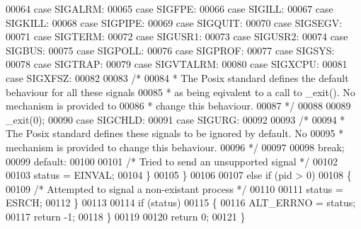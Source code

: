 \begin{DoxyCode}
00064     \textcolor{keywordflow}{case} SIGALRM:
00065     \textcolor{keywordflow}{case} SIGFPE:
00066     \textcolor{keywordflow}{case} SIGILL:
00067     \textcolor{keywordflow}{case} SIGKILL:
00068     \textcolor{keywordflow}{case} SIGPIPE:
00069     \textcolor{keywordflow}{case} SIGQUIT:
00070     \textcolor{keywordflow}{case} SIGSEGV:
00071     \textcolor{keywordflow}{case} SIGTERM:
00072     \textcolor{keywordflow}{case} SIGUSR1:
00073     \textcolor{keywordflow}{case} SIGUSR2:
00074     \textcolor{keywordflow}{case} SIGBUS:
00075     \textcolor{keywordflow}{case} SIGPOLL:
00076     \textcolor{keywordflow}{case} SIGPROF:
00077     \textcolor{keywordflow}{case} SIGSYS:
00078     \textcolor{keywordflow}{case} SIGTRAP:
00079     \textcolor{keywordflow}{case} SIGVTALRM:
00080     \textcolor{keywordflow}{case} SIGXCPU:
00081     \textcolor{keywordflow}{case} SIGXFSZ:
00082 
00083       \textcolor{comment}{/* }
00084 \textcolor{comment}{       * The Posix standard defines the default behaviour for all these signals }
00085 \textcolor{comment}{       * as being eqivalent to a call to \_exit(). No mechanism is provided to }
00086 \textcolor{comment}{       * change this behaviour.}
00087 \textcolor{comment}{       */}
00088 
00089       \_exit(0);
00090     \textcolor{keywordflow}{case} SIGCHLD:
00091     \textcolor{keywordflow}{case} SIGURG:
00092 
00093       \textcolor{comment}{/* }
00094 \textcolor{comment}{       * The Posix standard defines these signals to be ignored by default. No }
00095 \textcolor{comment}{       * mechanism is provided to change this behaviour.}
00096 \textcolor{comment}{       */}
00097 
00098       \textcolor{keywordflow}{break};
00099     \textcolor{keywordflow}{default}:
00100 
00101       \textcolor{comment}{/* Tried to send an unsupported signal */}
00102 
00103       status = EINVAL;
00104     \}
00105   \}
00106 
00107   \textcolor{keywordflow}{else} \textcolor{keywordflow}{if} (pid > 0)
00108   \{
00109     \textcolor{comment}{/* Attempted to signal a non-existant process */}
00110 
00111     status = ESRCH;
00112   \}
00113 
00114   \textcolor{keywordflow}{if} (status)
00115   \{
00116     ALT_ERRNO = status;
00117     \textcolor{keywordflow}{return} -1;
00118   \}
00119 
00120   \textcolor{keywordflow}{return} 0;
00121 \}
\end{DoxyCode}
